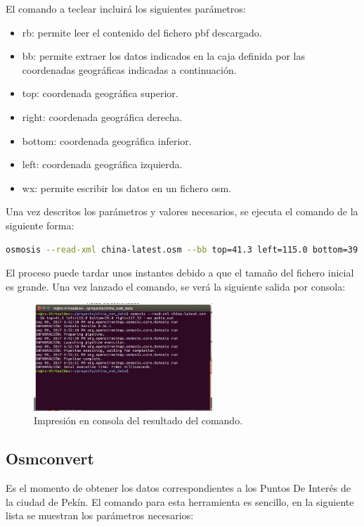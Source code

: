 El comando a teclear incluirá los siguientes parámetros:
\begin{itemize}
	\item rb: permite leer el contenido del fichero pbf descargado.
	\item bb: permite extraer los datos indicados en la caja definida por las coordenadas geográficas indicadas a continuación.
	\item top: coordenada geográfica superior.
	\item right: coordenada geográfica derecha.
	\item bottom: coordenada geográfica inferior.
	\item left: coordenada geográfica izquierda.
	\item wx: permite escribir los datos en un fichero osm.
\end{itemize}

Una vez descritos los parámetros y valores necesarios, se ejecuta el comando de la siguiente forma:

\begin{lstlisting}[language=bash]
	osmosis --read-xml china-latest.osm --bb top=41.3 left=115.0 bottom=39.4 right=117.35 --wx pekin.osm
\end{lstlisting}

El proceso puede tardar unos instantes debido a que el tamaño del fichero inicial es grande. Una vez lanzado el comando, se verá la siguiente salida por consola:

\begin{figure}[h]
  \centering
    \includegraphics[width=0.6\textwidth]{../img/osmextract/osmosis.jpg}
  \caption{Impresión en consola del resultado del comando.}
  \label{puntosGeograficos}
\end{figure}

\subsection{Osmconvert}
Es el momento de obtener los datos correspondientes a los Puntos De Interés de la ciudad de Pekín. El comando para esta herramienta es sencillo, en la siguiente lista se muestran los parámetros necesarios:

